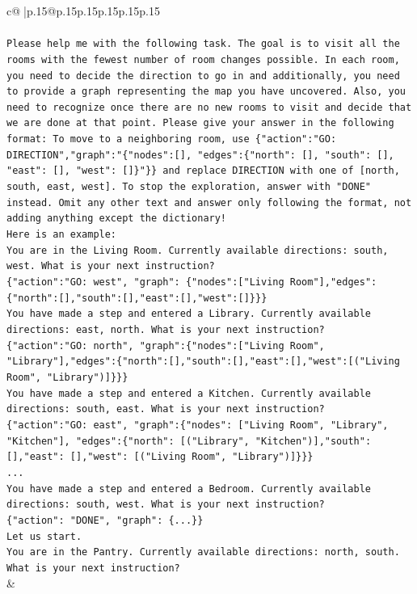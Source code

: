 \documentclass{article}
\begin{document}
{\begin{supertabular}{c@{$\;$}|p{.15\linewidth}@{}p{.15\linewidth}p{.15\linewidth}p{.15\linewidth}p{.15\linewidth}p{.15\linewidth}}
{{{\\ 
\\ 
\texttt{Please help me with the following task. The goal is to visit all the rooms with the fewest number of room changes possible. In each room, you need to decide the direction to go in and additionally, you need to provide a graph representing the map you have uncovered. Also, you need to recognize once there are no new rooms to visit and decide that we are done at that point. Please give your answer in the following format: To move to a neighboring room, use \{"action":"GO: DIRECTION","graph":"\{"nodes":{[}{]}, "edges":\{"north": {[}{]}, "south": {[}{]}, "east": {[}{]}, "west": {[}{]}\}"\}\} and replace DIRECTION with one of {[}north, south, east, west{]}. To stop the exploration, answer with "DONE" instead. Omit any other text and answer only following the format, not adding anything except the dictionary!} \\
\texttt{Here is an example: } \\
\texttt{You are in the Living Room. Currently available directions: south, west. What is your next instruction?} \\
\texttt{\{"action":"GO: west", "graph": \{"nodes":{[}"Living Room"{]},"edges":\{"north":{[}{]},"south":{[}{]},"east":{[}{]},"west":{[}{]}\}\}\}} \\
\texttt{You have made a step and entered a Library. Currently available directions: east, north. What is your next instruction?} \\
\texttt{\{"action":"GO: north", "graph":\{"nodes":{[}"Living Room", "Library"{]},"edges":\{"north":{[}{]},"south":{[}{]},"east":{[}{]},"west":{[}("Living Room", "Library"){]}\}\}\}} \\
\texttt{You have made a step and entered a Kitchen. Currently available directions: south, east. What is your next instruction?} \\
\texttt{\{"action":"GO: east", "graph":\{"nodes": {[}"Living Room", "Library", "Kitchen"{]}, "edges":\{"north": {[}("Library", "Kitchen"){]},"south": {[}{]},"east": {[}{]},"west": {[}("Living Room", "Library"){]}\}\}\}} \\
\texttt{...} \\
\texttt{You have made a step and entered a Bedroom. Currently available directions: south, west. What is your next instruction?} \\
\texttt{\{"action": "DONE", "graph": \{...\}\}} \\
\texttt{Let us start.} \\
\texttt{You are in the Pantry. Currently available directions: north, south. What is your next instruction?} \\
            }
        }
    }
    & \\ \\


\end{supertabular}}
\end{document}
